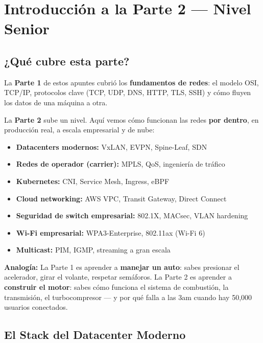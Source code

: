 \chapter{ Introducción a la Parte 2 --- Nivel Senior}

\section{ ¿Qué cubre esta parte?}

\begin{concepto}
La \textbf{Parte 1} de estos apuntes cubrió los \textbf{fundamentos de redes}:
el modelo OSI, TCP/IP, protocolos clave (TCP, UDP, DNS, HTTP, TLS, SSH) y
cómo fluyen los datos de una máquina a otra.

La \textbf{Parte 2} sube un nivel. Aquí vemos cómo funcionan las redes
\textbf{por dentro}, en producción real, a escala empresarial y de nube:

\begin{itemize}
    \item \textbf{Datacenters modernos:} VxLAN, EVPN, Spine-Leaf, SDN
    \item \textbf{Redes de operador (carrier):} MPLS, QoS, ingeniería de tráfico
    \item \textbf{Kubernetes:} CNI, Service Mesh, Ingress, eBPF
    \item \textbf{Cloud networking:} AWS VPC, Transit Gateway, Direct Connect
    \item \textbf{Seguridad de switch empresarial:} 802.1X, MACsec, VLAN hardening
    \item \textbf{Wi-Fi empresarial:} WPA3-Enterprise, 802.11ax (Wi-Fi 6)
    \item \textbf{Multicast:} PIM, IGMP, streaming a gran escala
\end{itemize}

 \textbf{Analogía:}
La Parte 1 es aprender a \textbf{manejar un auto}: sabes presionar el acelerador,
girar el volante, respetar semáforos.
La Parte 2 es aprender a \textbf{construir el motor}: sabes cómo funciona
el sistema de combustión, la transmisión, el turbocompresor --- y por qué
falla a las 3am cuando hay 50{,}000 usuarios conectados.
\end{concepto}

\section{ El Stack del Datacenter Moderno}

